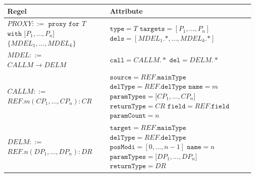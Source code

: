 \documentclass[a4paper,12pt]{article}
\begin{document}
\begin{table}[h!]
\centering
\begin{tabular}{|p{6cm}|p{8cm}|}
\hline
\hline
\centering\textbf{Regel} & \textbf{Attribute} \\
\hline
\hline
$\mathit{PROXY} ::=$\newline
$\texttt{proxy } \texttt{for } T$\newline
$ \texttt{with [}\mathit{P_1},...,\mathit{P_n}\texttt{]}$ \newline
$\texttt{\{}\mathit{MDEL_1},...,\mathit{MDEL_k} \texttt{\}}$
& 
$\texttt{type} = \mathit{T}$\newline
$\texttt{targets} = [\mathit{P_1},...,\mathit{P_n}]$\newline
$\texttt{dels} = [\mathit{MDEL_1}\texttt{.}\text{*},...,\mathit{MDEL_k}\texttt{.}\text{*}]$
\\
\hline
$\mathit{MDEL} ::=$\newline
$\mathit{CALLM} \rightarrow \mathit{DELM} $  
& 
$\texttt{call} = \mathit{CALLM}.*$\newline
$\texttt{del} = \mathit{DELM}.*$
\\
\hline
$\mathit{CALLM} ::=$\newline 
$\mathit{REF}.\mathit{m(\mathit{CP_1},...,\mathit{CP_n}):CR}$
& 
$\texttt{source} = \mathit{REF.\texttt{mainType}}$\newline
$\texttt{delType} = \mathit{REF.\texttt{delType}}$\newline
$\texttt{name} = \mathit{m}$\newline
$\texttt{paramTypes} = \mathit{[CP_1},...,\mathit{CP_n]}$\newline
$\texttt{returnType} = \mathit{CR}$\newline
$\texttt{field} = \mathit{REF}\texttt{.field}$\newline
$\texttt{paramCount} = n$
\\
\hline
$\mathit{DELM} ::=$\newline 
$\mathit{REF}\texttt{.}n(\mathit{DP_1},...,\mathit{DP_n}):DR $  
&
$\texttt{target} = \mathit{REF}.\texttt{mainType}$\newline
$\texttt{delType} = \mathit{REF}.\texttt{delType}$\newline
$\texttt{posModi} = [0,...,\mathit{n}-1]$\newline
$\texttt{name} = \mathit{n}$\newline
$\texttt{paramTypes} = \mathit{[DP_1},...,\mathit{DP_n]}$\newline
$\texttt{returnType} = \mathit{DR}$\newline

\end{tabular}
\end{table}
\end{document}
